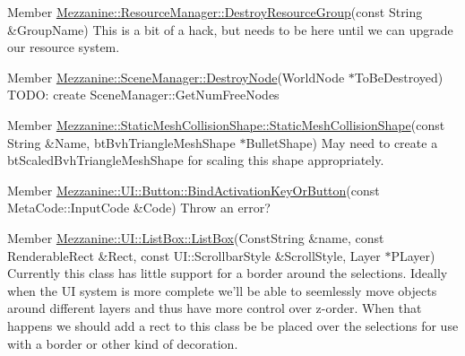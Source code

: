 \label{todo__todo000022}
\hypertarget{todo__todo000022}{}
 
\begin{DoxyDescription}
\item[Member \hyperlink{classMezzanine_1_1ResourceManager_aa827efdad18698b7d7319dab35864bbe}{Mezzanine::ResourceManager::DestroyResourceGroup}(const String \&GroupName) ]This is a bit of a hack, but needs to be here until we can upgrade our resource system. 
\end{DoxyDescription}

\label{todo__todo000023}
\hypertarget{todo__todo000023}{}
 
\begin{DoxyDescription}
\item[Member \hyperlink{classMezzanine_1_1SceneManager_ab6123477f052d34a357db85a8284c8be}{Mezzanine::SceneManager::DestroyNode}(WorldNode $\ast$ToBeDestroyed) ]TODO: create SceneManager::GetNumFreeNodes 
\end{DoxyDescription}

\label{todo__todo000003}
\hypertarget{todo__todo000003}{}
 
\begin{DoxyDescription}
\item[Member \hyperlink{classMezzanine_1_1StaticMeshCollisionShape_a1c565cc4d62ab7a0cd5cf55254905f05}{Mezzanine::StaticMeshCollisionShape::StaticMeshCollisionShape}(const String \&Name, btBvhTriangleMeshShape $\ast$BulletShape) ]May need to create a btScaledBvhTriangleMeshShape for scaling this shape appropriately. 
\end{DoxyDescription}

\label{todo__todo000024}
\hypertarget{todo__todo000024}{}
 
\begin{DoxyDescription}
\item[Member \hyperlink{classMezzanine_1_1UI_1_1Button_aae0a7f6a07f79856ed6da8b8b3bc5ecd}{Mezzanine::UI::Button::BindActivationKeyOrButton}(const MetaCode::InputCode \&Code) ]Throw an error? 
\end{DoxyDescription}

\label{todo__todo000025}
\hypertarget{todo__todo000025}{}
 
\begin{DoxyDescription}
\item[Member \hyperlink{classMezzanine_1_1UI_1_1ListBox_a60130f372bc78fbb20f28270bbed8cf2}{Mezzanine::UI::ListBox::ListBox}(ConstString \&name, const RenderableRect \&Rect, const UI::ScrollbarStyle \&ScrollStyle, Layer $\ast$PLayer) ]Currently this class has little support for a border around the selections. Ideally when the UI system is more complete we'll be able to seemlessly move objects around different layers and thus have more control over z-\/order. When that happens we should add a rect to this class be be placed over the selections for use with a border or other kind of decoration. 
\end{DoxyDescription}

